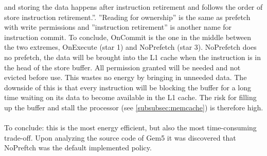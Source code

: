  and storing the data happens after instruction retirement and follows the order of store
instruction retirement.”. ”Reading for ownership” is the same as prefetch with write
permissions and ”instruction retirement” is another name for instruction commit. To
conclude, OnCommit is the one in the middle between the two extremes, OnExecute
(star 1) and NoPrefetch (star 3).
 NoPrefetch does no prefetch, the data will be brought into
the L1 cache when the instruction is in the head of the store buffer. All permission
granted will be needed and not evicted before use. This wastes no energy by bringing
in unneeded data. The downside of this is that every instruction will be blocking the
buffer for a long time waiting on its data to become available in the L1 cache. The
risk for filling up the buffer and stall the processor (see \ref{subsubsec:memcache}) is therefore high.
\\ \\
To conclude: this is the most energy efficient, but also the most time-consuming
trade-off. Upon analyzing the source code of Gem5 \cite{gem5} it was discovered that NoPreftch was the default implemented policy.


